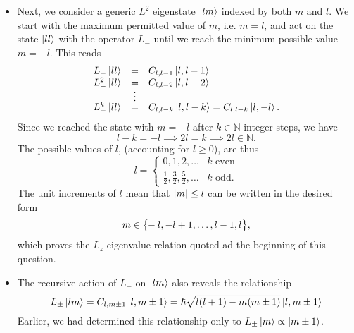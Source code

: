 \documentclass[11pt, a4paper]{article}
\renewcommand{\k}[1]{\ket{#1}}
\begin{document}
\begin{itemize}
	\item Next, we consider a generic $ L^{2} $ eigenstate $ \ket{lm} $ indexed by both $ m $ and $ l $. We start with the maximum permitted value of $ m $, i.e. $ m = l $, and act on the state $ \ket{ll} $ with the operator $ L_{-} $ until we reach the minimum possible value $ m = -l $. This reads
	\begin{equation*}
		\begin{array}{lcl}
			L_{-}\k{ll}     & = & C_{l,l-1}\k{l, l-1}\\
			L^{2}_{-}\k{ll} & = & C_{l,l-2}\k{l, l-2}\\[-0.3em]
			& \vdots &\\[-0.3em]
			L^{k}_{-}\k{ll} & = & C_{l,l-k}\k{l, l-k} =  C_{l,l-k}\k{l, -l}.
		\end{array}
	\end{equation*}
	Since we reached the state with $ m = -l $ after $ k \in \mathbb{N}$ integer steps, we have
	\begin{equation*}
		l - k = - l \implies 2l = k \implies 2l \in \mathbb{N}.
	\end{equation*}
	The possible values of $ l $, (accounting for $ l \geq 0 $), are thus
	\begin{equation*}
		l = 
		\begin{cases}
			0, 1, 2, \ldots & k \text{ even}\\
			\frac{1}{2}, \frac{3}{2}, \frac{5}{2}, \ldots & k \text{ odd}.
		\end{cases}
	\end{equation*}
	The unit increments of $ l $ mean that $ \abs{m} \leq l $ can be written in the desired form
	\begin{equation*}
		m \in \big\{\hspace{-0.3em}-l, -l+1, \ldots, l-1, l\big\},
	\end{equation*}
    which proves the $ L_{z} $ eigenvalue relation quoted ad the beginning of this question.
	
	
	\item The recursive action of $ L_{-} $ on $ \ket{lm} $ also reveals the relationship
	\begin{equation*}
		L_{\pm}\ket{lm} = C_{l, m \pm 1} \ket{l, m \pm 1} = \hbar \sqrt{l (l+1) - m(m\pm 1)} \ket{l, m \pm 1}
	\end{equation*}
	Earlier, we had determined this relationship only to $ L_{\pm} \ket{m} \propto \ket{m \pm 1} $.
	
\end{itemize}
\end{document}
